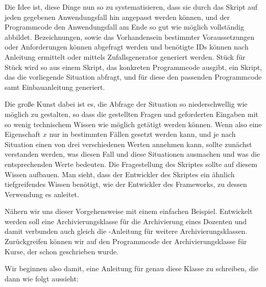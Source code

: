 Die Idee ist, diese Dinge nun so zu systematisieren, dass sie durch das Skript auf jeden gegebenen Anwendungsfall hin angepasst werden können, und der Programmcode den Anwendungsfall am Ende so gut wie möglich vollständig abbildet. Bezeichnungen, sowie das Vorhandensein bestimmter Voraussetzungen oder Anforderungen können abgefragt werden und benötigte IDs können nach Anleitung ermittelt oder mittels Zufallsgenerator generiert werden. Stück für Stück wird so aus einem Skript, das konkreten Programmcode ausgibt, ein Skript, das die vorliegende Situation abfragt, und für diese den passenden Programmcode samt Einbauanleitung generiert.

Die große Kunst dabei ist es, die Abfrage der Situation so niederschwellig wie möglich zu gestalten, so dass die gestellten Fragen und geforderten Eingaben mit so wenig technischem Wissen wie möglich getätigt werden können. Wenn also eine Eigenschaft $x$ nur in bestimmten Fällen gesetzt werden kann, und je nach Situation einen von drei verschiedenen Werten annehmen kann, sollte zunächst verstanden werden, was diesen Fall und diese Situationen ausmachen und was die entsprechenden Werte bedeuten. Die Fragestellung des Skriptes sollte auf diesem Wissen aufbauen. Man sieht, dass der Entwickler des Skriptes ein ähnlich tiefgreifendes Wissen benötigt, wie der Entwickler des Frameworks, zu dessen Verwendung es anleitet.

Nähern  wir uns dieser Vorgehensweise mit einem einfachen Beispiel. Entwickelt werden soll eine Archivierungsklasse für die Archivierung eines Dozenten und damit verbunden auch gleich die \FPZb-Anleitung für weitere Archivierungsklassen. Zurückgreifen können wir auf den Programmcode der Archivierungsklasse für Kurse, der schon geschrieben wurde. 

Wir beginnen also damit, eine Anleitung für genau diese Klasse zu schreiben, die dann wie folgt aussieht:

